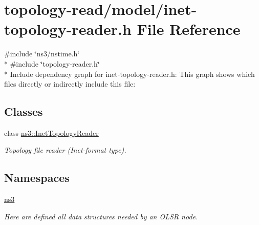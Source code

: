 \hypertarget{inet-topology-reader_8h}{}\section{topology-\/read/model/inet-\/topology-\/reader.h File Reference}
\label{inet-topology-reader_8h}
{\ttfamily \#include \char`\"{}ns3/nstime.\+h\char`\"{}}\\*
{\ttfamily \#include \char`\"{}topology-\/reader.\+h\char`\"{}}\\*
Include dependency graph for inet-\/topology-\/reader.h\+:
This graph shows which files directly or indirectly include this file\+:
\subsection*{Classes}
\begin{DoxyCompactItemize}
\item 
class \hyperlink{classns3_1_1InetTopologyReader}{ns3\+::\+Inet\+Topology\+Reader}
\begin{DoxyCompactList}\small\item\em Topology file reader (Inet-\/format type). \end{DoxyCompactList}\end{DoxyCompactItemize}
\subsection*{Namespaces}
\begin{DoxyCompactItemize}
\item 
 \hyperlink{namespacens3}{ns3}
\begin{DoxyCompactList}\small\item\em Here are defined all data structures needed by an O\+L\+SR node. \end{DoxyCompactList}\end{DoxyCompactItemize}
